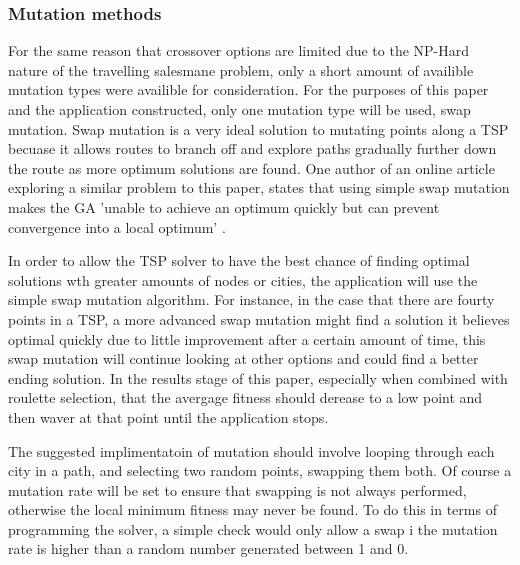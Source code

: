 \documentclass[article]{IEEEtran}
\begin{document}
\subsubsection{Mutation methods}
For the same reason that crossover options are limited due to the NP-Hard nature of the travelling salesmane problem, only a short amount of availible mutation types were availible for consideration. For the purposes of this paper and the application constructed, only one mutation type will be used, swap mutation. Swap mutation is a very ideal solution to mutating points along a TSP becuase it allows routes to branch off and explore paths gradually further down the route as more optimum solutions are found. One author of an online article exploring a similar problem to this paper, states that using simple swap mutation makes the GA 'unable to achieve an optimum quickly but can prevent convergence into a local optimum' \cite{8}. \par
In order to allow the TSP solver to have the best chance of finding optimal solutions wth greater amounts of nodes or cities, the application will use the simple swap mutation algorithm. For instance, in the case that there are fourty points in a TSP, a more advanced swap mutation might find a solution it believes optimal quickly due to little improvement after a certain amount of time, this swap mutation will continue looking at other options and could find a better ending solution. In the results stage of this paper, especially when combined with roulette selection, that the avergage fitness should derease to a low point and then waver at that point until the application stops.\par
The suggested implimentatoin of mutation should involve looping through each city in a path, and selecting two random points, swapping them both. Of course a mutation rate will be set to ensure that swapping is not always performed, otherwise the local minimum fitness may never be found. To do this in terms of programming the solver, a simple check would only allow a swap i the mutation rate is higher than a random number generated between 1 and 0.
\end{document}
